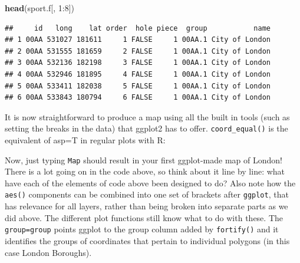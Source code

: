 \documentclass[]{article}
\newenvironment{Shaded}{}{}
\newcommand{\KeywordTok}[1]{\textcolor[rgb]{0.00,0.44,0.13}{\textbf{{#1}}}}
\newcommand{\DataTypeTok}[1]{\textcolor[rgb]{0.56,0.13,0.00}{{#1}}}
\newcommand{\DecValTok}[1]{\textcolor[rgb]{0.25,0.63,0.44}{{#1}}}
\newcommand{\StringTok}[1]{\textcolor[rgb]{0.25,0.44,0.63}{{#1}}}
\newcommand{\NormalTok}[1]{{#1}}
\begin{document}
\begin{Shaded}
\begin{Highlighting}[]
\KeywordTok{head}\NormalTok{(sport.f[, }\DecValTok{1}\NormalTok{:}\DecValTok{8}\NormalTok{])}
\end{Highlighting}
\end{Shaded}

\begin{verbatim}
##     id   long    lat order  hole piece  group           name
## 1 00AA 531027 181611     1 FALSE     1 00AA.1 City of London
## 2 00AA 531555 181659     2 FALSE     1 00AA.1 City of London
## 3 00AA 532136 182198     3 FALSE     1 00AA.1 City of London
## 4 00AA 532946 181895     4 FALSE     1 00AA.1 City of London
## 5 00AA 533411 182038     5 FALSE     1 00AA.1 City of London
## 6 00AA 533843 180794     6 FALSE     1 00AA.1 City of London
\end{verbatim}

It is now straightforward to produce a map using all the built in tools
(such as setting the breaks in the data) that ggplot2 has to offer.
\texttt{coord\_equal()} is the equivalent of asp=T in regular plots with
R:

\begin{Shaded}
\end{Shaded}

Now, just typing \texttt{Map} should result in your first ggplot-made
map of London! There is a lot going on in the code above, so think about
it line by line: what have each of the elements of code above been
designed to do? Also note how the \texttt{aes()} components can be
combined into one set of brackets after \texttt{ggplot}, that has
relevance for all layers, rather than being broken into separate parts
as we did above. The different plot functions still know what to do with
these. The \texttt{group=group} points ggplot to the group column added
by \texttt{fortify()} and it identifies the groups of coordinates that
pertain to individual polygons (in this case London Boroughs).
\end{document}
